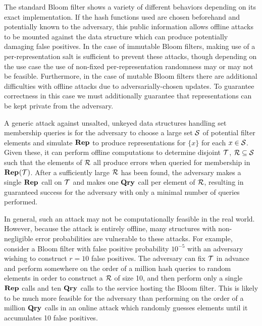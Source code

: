 
%

The standard Bloom filter shows a variety of different behaviors depending on its exact implementation. If the hash functions used are chosen beforehand and potentially known to the adversary, this public information allows offline attacks to be mounted against the data structure which can produce potentially damaging false positives. In the case of immutable Bloom filters, making use of a per-representation salt is sufficient to prevent these attacks, though depending on the use case the use of non-fixed per-representation randomness may or may not be feasible. Furthermore, in the case of mutable Bloom filters there are additional difficulties with offline attacks due to adversarially-chosen updates. To guarantee correctness in this case we must additionally guarantee that representations can be kept private from the adversary.

A generic attack against unsalted, unkeyed data structures handling set membership queries is for the adversary to choose a large set $\mathcal{S}$ of potential filter elements and simulate $\mathbf{Rep}\hspace{0.5pt}$ to produce representations for $\{x\}$ for each $x \in \mathcal{S}$. Given these, it can perform offline computations to determine disjoint $\mathcal{T}$, $\mathcal{R} \subseteq \mathcal{S}$ such that the elements of $\mathcal{R}$ all produce errors when queried for membership in $\mathbf{Rep}\hspace{0.5pt}(\mathcal{T})$. After a sufficiently large $\mathcal{R}$ has been found, the adversary makes a single $\mathbf{Rep}\hspace{0.5pt}$ call on $\mathcal{T}$ and makes one $\mathbf{Qry}\hspace{0.5pt}$ call per element of $\mathcal{R}$, resulting in guaranteed success for the adversary with only a minimal number of queries performed.

In general, such an attack may not be computationally feasible in the real world. However, because the attack is entirely offline, many structures with non-negligible error probabilities are vulnerable to these attacks. For example, consider a Bloom filter with false positive probability $10^{-5}$ with an adversary wishing to construct $r = 10$ false positives. The adversary can fix $\mathcal{T}$ in advance and perform somewhere on the order of a million hash queries to random elements in order to construct a $\mathcal{R}$ of size 10, and then perform only a single $\mathbf{Rep}\hspace{0.5pt}$ calls and ten $\mathbf{Qry}\hspace{0.5pt}$ calls to the service hosting the Bloom filter. This is likely to be much more feasible for the adversary than performing on the order of a million $\mathbf{Qry}\hspace{0.5pt}$ calls in an online attack which randomly guesses elements until it accumulates 10 false positives.


